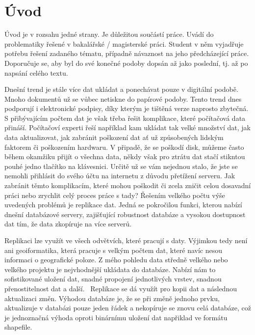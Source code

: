 \documentclass{thesisKGI}
\begin{document}
    \section*{Úvod}

      Úvod je v rozsahu jedné strany. Je důležitou součástí práce. Uvádí
      do problematiky řešené v bakalářské / magisterské práci. Student v
      něm vyjadřuje potřebu řešení zadaného tématu, případně návaznost na
      jeho předcházející práce. Doporučuje se, aby byl do své konečné
      podoby dopsán až jako poslední, tj. až po napsání celého textu.

      Dnešní trend je stále více dat ukládat a ponechávat pouze v
      digitální podobě. Mnoho dokumentů už se vůbec netiskne do papírové
      podoby. Tento trend dnes podporují i elektronické podpisy, díky
      kterým je tištěná verze naprosto zbytečná. S přibývajícím počtem
      dat je však třeba řešit komplikace, které počítačová data přináší.
      Počítačoví experti řeší například kam ukládat tak velké množství
      dat, jak data aktualizovat, jak zabránit poškození dat ať už
      způsobených lidským faktorem či poškozením hardwaru. V připadě, že
      se poškodí disk, můžeme často během okamžiku přijít o všechna
      data, někdy však pro ztrátu dat stačí stikntou pouhé jedno
      tlačítko na klávesnici. Určitě už se vám nejednou stalo, že jste
      se nemohli přihlásit do svého účtu na internetu z důvodu přetížení
      serveru. Jak zabránit těmto komplikacím, které mohou poškodit či
      zcela zničit celou dosavadní práci nebo zrychlit celý proces práce
      s tady? Řešením velkého počtu výše uvedených problémů je replikace
      dat. Jedná se pokročilou funkci, kterou nabízí dnešní databázové
      servery, zajišťující robustnost databáze a vysokou dostupnost dat
      tím, že data zkopíruje na více serverů.
      
      Replikaci lze využít ve všech odvětvích, které pracují s daty.
      Výjimkou tedy není ani geoiformatika, která pracuje s velkým
      počtem dat, které navíc nesou informaci o geografické poloze. Z
      mého pohledu data středně velkého nebo velkého projektu je
      nejvhodnější ukládata do databáze. Nabízí nám to sofistikované
      uložení dat, snadné propojení jednotlivých vrstev, snadnou
      přenostitelnost dat a další.  Replikace se dá využít pro kopii
      dat a následnou aktualizaci změn. Výhodou databáze je, že se při
      změně jednoho prvku, aktualizuje v databázi pouze jeden řádek a
      nekopíruje se znovu celá databáze, což je jednoznačná výhoda
      oproti binárnímu uložení dat napřiklad ve formátu shapefile.
      
\end{document}
